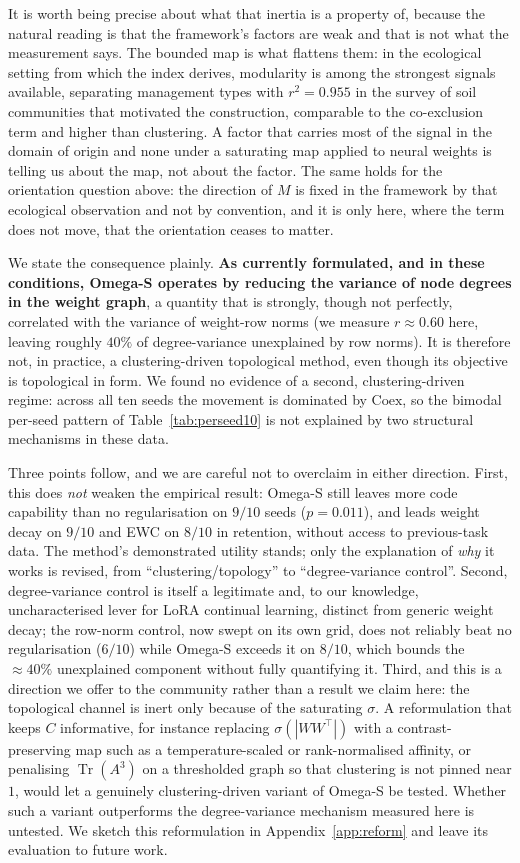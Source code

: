 \documentclass[11pt,a4paper]{article}
\begin{document}
It is worth being precise about what that inertia is a property of, because the
natural reading is that the framework's factors are weak and that is not what
the measurement says. The bounded map is what flattens them: in the ecological
setting from which the index derives, modularity is among the strongest signals
available, separating management types with $r^2 = 0.955$ in the survey of soil
communities that motivated the construction, comparable to the co-exclusion
term and higher than clustering. A factor that carries most of the signal in
the domain of origin and none under a saturating map applied to neural weights
is telling us about the map, not about the factor. The same holds for the
orientation question above: the direction of $M$ is fixed in the framework by
that ecological observation and not by convention, and it is only here, where
the term does not move, that the orientation ceases to matter.


We state the consequence plainly. \textbf{As currently formulated, and in
these conditions, Omega-S operates by reducing the variance of node degrees
in the weight graph}, a quantity that is strongly, though not perfectly,
correlated with the variance of weight-row norms (we measure
$r\approx0.60$ here, leaving roughly $40\%$ of degree-variance unexplained by
row norms). It is therefore not, in practice, a clustering-driven
topological method, even though its objective is topological in form. We
found no evidence of a second, clustering-driven regime: across all ten
seeds the movement is dominated by $\mathrm{Coex}$, so the bimodal per-seed
pattern of Table~\ref{tab:perseed10} is not explained by two structural
mechanisms in these data.

Three points follow, and we are careful not to overclaim in either
direction. First, this does \emph{not} weaken the empirical result: Omega-S
still leaves more code capability than no regularisation on $9/10$ seeds
($p=0.011$), and leads weight decay on $9/10$ and EWC on $8/10$ in retention,
without access to previous-task data. The method's demonstrated utility
stands; only the explanation of \emph{why} it works is revised, from
``clustering/topology'' to ``degree-variance control''. Second, degree-variance
control is itself a legitimate and, to our knowledge, uncharacterised lever
for LoRA continual learning, distinct from generic weight decay; the
row-norm control, now swept on its own grid, does not reliably beat no
regularisation ($6/10$) while Omega-S exceeds it on $8/10$, which bounds the
$\approx40\%$ unexplained component without fully quantifying it. Third, and this is a direction we offer to
the community rather than a result we claim here: the topological channel is
inert only because of the saturating $\sigma$. A reformulation that keeps
$C$ informative, for instance replacing $\sigma(|WW^\top|)$ with a contrast-
preserving map such as a temperature-scaled or rank-normalised affinity, or
penalising $\operatorname{Tr}(A^3)$ on a thresholded graph so that clustering
is not pinned near $1$, would let a genuinely clustering-driven variant of
Omega-S be tested. Whether such a variant outperforms the degree-variance
mechanism measured here is untested.
We sketch this reformulation in Appendix~\ref{app:reform} and leave its
evaluation to future work.
\end{document}
